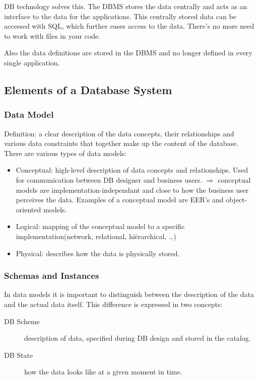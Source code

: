 DB technology solves this. The DBMS stores the data centrally and acts as an interface to the data for the applications. This centrally stored data can be accessed with SQL, which further eases access to the data. There's no more need to work with files in your code.

Also the data definitions are stored in the DBMS and no longer defined in every single application.


\subsection{Elements of a Database System}
\subsubsection{Data Model}
Definition: a clear description of the data concepts, their relationships and various data constraints that together make up the content of the database. There are various types of data models:
\begin{itemize}
  \item Conceptual: high-level description of data concepts and relationships. Used for communication between DB designer and business users. $\Rightarrow$ conceptual models are implementation-independant and close to how the business user perceives the data. Examples of a conceptual model are EER's and object-oriented models.
  \item Logical: mapping of the conceptual model to a specific implementation(network, relational, hiërarchical, \dots)
  \item Physical: describes how the data is physically stored.
\end{itemize}

\subsubsection{Schemas and Instances}
In data models it is important to distinguish between the description of the data and the actual data itself. This difference is expressed in two concepts:
\begin{description}
  \item[DB Scheme] description of data, specified during DB design and stored in the catalog.
  \item[DB State] how the data looks like at a given moment in time.
\end{description}

